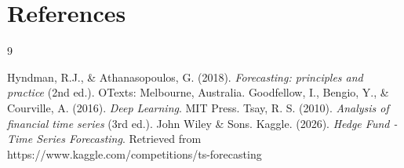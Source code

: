 \section{References}
\label{sec:references}

\begin{thebibliography}{9}

 Hyndman, R.J., \& Athanasopoulos, G. (2018). \emph{Forecasting: principles and practice} (2nd ed.). OTexts: Melbourne, Australia.
 Goodfellow, I., Bengio, Y., \& Courville, A. (2016). \emph{Deep Learning}. MIT Press.
 Tsay, R. S. (2010). \emph{Analysis of financial time series} (3rd ed.). John Wiley \& Sons.
 Kaggle. (2026). \emph{Hedge Fund - Time Series Forecasting}. Retrieved from https://www.kaggle.com/competitions/ts-forecasting

\end{thebibliography}
